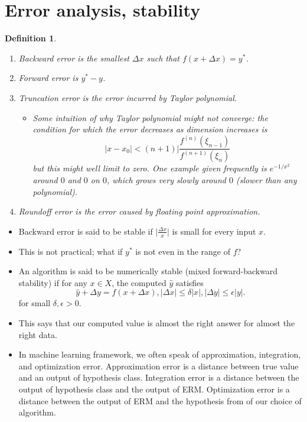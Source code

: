 \documentclass[11pt,reqno]{amsart}
\newtheorem{definition}{Definition}
\theoremstyle{remark}
\begin{document}
\section{Error analysis, stability}
\begin{definition}
\begin{enumerate}
\item Backward error is the smallest $\Delta x$ such that $f(x+\Delta x)=y^*$. 
\item Forward error is $y^*-y$.
\item Truncation error is the error incurred by Taylor polynomial. 
\begin{itemize}
\item Some intuition of why Taylor polynomial might not converge: the condition for which the error decreases as dimension increases is  
\[
  \lvert x-x_0\rvert<(n+1)\lvert\frac{f^{(n)}
(\xi_{n-1})}{f^{(n+1)}(\xi_n)}
\]
but this might well limit to zero. One example given frequently is $e^{-1/x^2}$ around $0$ and $0$ on $0$, which grows very slowly 
around $0$ (slower than any polynomial).
\end{itemize}
\item Roundoff error is the error caused by floating point approximation.
\end{enumerate}
\end{definition}
\begin{itemize}
\item Backward error is said to be stable if $\lvert\frac{\Delta x}{x}\rvert$ is small for every input $x$. 
\item This is not practical; what if $y^*$ is not even in the range of $f$?
\item An algorithm is said to be numerically stable (mixed forward-backward stability) if 
for any $x\in X$, the computed $\hat y$ satisfies
\[
\hat y + \Delta y=f(x+\Delta x), \lvert \Delta x\rvert\leq \delta\lvert x\rvert, 
\lvert \Delta y\lvert\leq\epsilon\lvert y\rvert.
\]
for small $\delta, \epsilon>0$.
\item This says that our computed value is almost the right answer for almost the right data.
\item In machine learning framework, we often speak of approximation, integration, and optimization error. 
Approximation error is a distance between true value and an output of hypothesis class.
 Integration error is a distance between the output of hypothesis class and the output of ERM.
  Optimization error is a distance between the output of ERM and the hypothesis from of our choice of algorithm.
\end{itemize}
\end{document}
